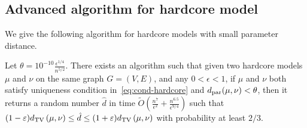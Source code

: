 




\subsection{Advanced algorithm for hardcore model}\label{sec:var-main}

We give the following algorithm for hardcore models with small parameter distance.
\begin{theorem}\label{thm:hardcore-adv}
Let $\theta = 10^{-10}\frac{\epsilon^{1/4}}{n^{5/2}}$.
There exists an algorithm such that given two hardcore models $\mu$ and $\nu$ on the same graph $G=(V,E)$, and any $0 < \epsilon <1$, if $\mu$ and $\nu$ both satisfy uniqueness condition in~\eqref{eq:cond-hardcore} and $d_\mathrm{par}(\mu,\nu) < \theta$, then it returns a random number $\hat{d}$ in time $\tilde{O}\left(\frac{n^7}{\epsilon^2}+\frac{n^{6.5}}{\epsilon^{9/4}}\right)$ such that $(1 - \varepsilon)d_{\mathrm{TV}}\left({\mu},{\nu}\right) \leq \hat{d} \leq (1+\varepsilon)d_{\mathrm{TV}}\left({\mu},{\nu}\right)$ with probability at least $2/3$.
\end{theorem}

